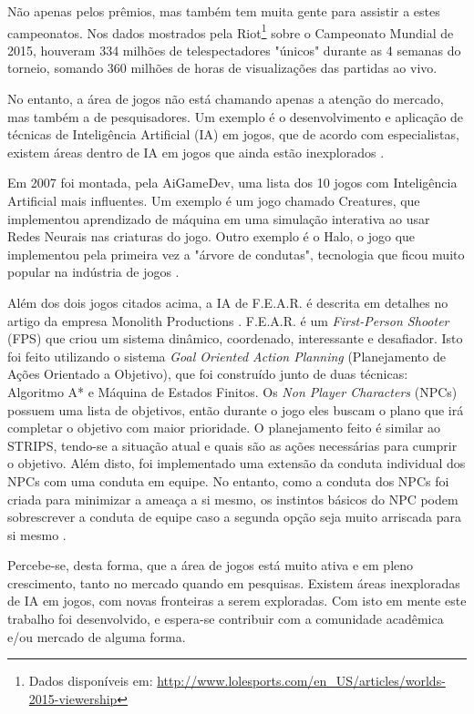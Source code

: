 \documentclass[
	12pt,					%
	openright,				%
	oneside,				%
	a4paper,				%
	bibjustif,				%
	chapter=TITLE,			%
	english,				%
	brazil,					%
	]{abntex2}
\begin{document}
	Não apenas pelos prêmios, mas também tem muita gente para assistir a estes campeonatos.
	Nos dados mostrados pela Riot\footnote{Dados disponíveis em: \url{http://www.lolesports.com/en_US/articles/worlds-2015-viewership}}
	sobre o Campeonato Mundial de 2015,
	houveram 334 milhões de telespectadores "únicos"{} durante as 4 semanas do torneio,
	somando 360 milhões de horas de visualizações das partidas ao vivo.
	
	No entanto, a área de jogos não está chamando apenas a atenção do mercado,
	mas também a de pesquisadores.
	Um exemplo é o desenvolvimento e aplicação de técnicas de Inteligência Artificial (IA) em jogos,
	que de acordo com especialistas,
	existem áreas dentro de IA em jogos que ainda estão inexplorados \cite{panoramaAI}.
	
	Em 2007 foi montada, pela AiGameDev, uma lista dos 10 jogos com Inteligência Artificial mais influentes.
	Um exemplo é um jogo chamado Creatures,
	que implementou aprendizado de máquina em uma simulação interativa
	ao usar Redes Neurais nas criaturas do jogo.
	Outro exemplo é o Halo,
	o jogo que implementou pela primeira vez a "árvore de condutas"{},
	tecnologia que ficou muito popular na indústria de jogos \cite{aigamedev}.
	
	Além dos dois jogos citados acima, a IA de F.E.A.R. é descrita em detalhes no artigo da empresa Monolith Productions \cite{fear}.
	F.E.A.R. é um \textit{First-Person Shooter} (FPS) que criou um sistema dinâmico, coordenado, interessante e desafiador.
	Isto foi feito utilizando o sistema \textit{Goal Oriented Action Planning} (Planejamento de Ações Orientado a Objetivo),
	que foi construído junto de duas técnicas: Algoritmo A* e Máquina de Estados Finitos.
	Os \textit{Non Player Characters} (NPCs) possuem uma lista de objetivos,
	então durante o jogo eles buscam o plano que irá completar o objetivo com maior prioridade.
	O planejamento feito é similar ao STRIPS,
	tendo-se a situação atual e quais são as ações necessárias para cumprir o objetivo.
	Além disto, foi implementado uma extensão da conduta individual dos NPCs
	com uma conduta em equipe.
	No entanto, como a conduta dos NPCs foi criada para minimizar a ameaça a si mesmo,
	os instintos básicos do NPC podem sobrescrever a conduta de equipe
	caso a segunda opção seja muito arriscada para si mesmo \cite{fear}.
	
	Percebe-se, desta forma, que a área de jogos está muito ativa e em pleno crescimento,
	tanto no mercado quando em pesquisas.
	Existem áreas inexploradas de IA em jogos,
	com novas fronteiras a serem exploradas.
	Com isto em mente este trabalho foi desenvolvido,
	e espera-se contribuir com a comunidade acadêmica e/ou mercado de alguma forma.
\end{document}
